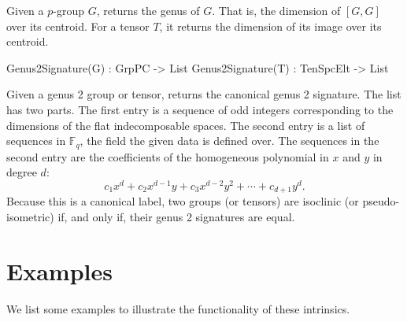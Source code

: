 \documentclass{documentation}
\begin{document}
Given a $p$-group $G$, returns the genus of $G$. 
That is, the dimension of $[G,G]$ over its centroid.
For a tensor $T$, it returns the dimension of its image over its centroid. 

\begin{intrinsics}
Genus2Signature(G) : GrpPC -> List
Genus2Signature(T) : TenSpcElt -> List
\end{intrinsics}

Given a genus 2 group or tensor, returns the canonical genus 2 signature. 
The list has two parts.
The first entry is a sequence of odd integers corresponding to the dimensions of the flat indecomposable spaces.
The second entry is a list of sequences in $\mathbb{F}_q$, the field the given data is defined over.
The sequences in  the second entry are the coefficients of the homogeneous polynomial in $x$ and $y$ in degree $d$:
\[ c_1x^d + c_2 x^{d-1}y + c_3 x^{d-2}y^2 + \cdots + c_{d+1}y^d. \]
Because this is a canonical label, two groups (or tensors) are isoclinic (or pseudo-isometric) if, and only if, their genus 2 signatures are equal. 

\section{Examples}
We list some examples to illustrate the functionality of these intrinsics.
\end{document}
